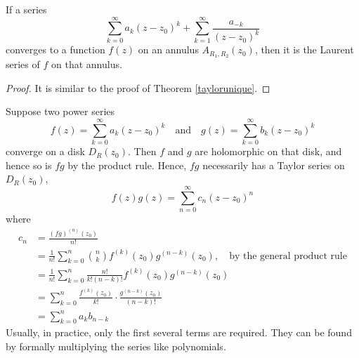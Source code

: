 \vspace*{1em}

\begin{theorem}\label{laurentunique}
If a series
\[\sum_{k=0}^\infty a_k(z - z_0)^k + \sum_{k=1}^\infty \frac{a_{-k}}{(z - z_0)^k}\]
converges to a function $f(z)$ on an annulus $A_{R_1,R_2}(z_0)$, then it is the Laurent series of $f$ on that annulus.
\end{theorem}
\begin{proof}
It is similar to the proof of Theorem \ref{taylorunique}.
\end{proof}

\vspace*{1em}

\begin{discussion}\label{powserprod}
Suppose two power series
\[f(z) = \sum_{k=0}^\infty a_k(z - z_0)^k \quad \text{and} \quad g(z) = \sum_{k=0}^\infty b_k(z - z_0)^k\]
converge on a disk $D_R(z_0)$. Then $f$ and $g$ are holomorphic on that disk, and hence so is $fg$ by the product rule. Hence, $fg$ necessarily has a Taylor series on $D_R(z_0)$,
\[f(z)g(z) = \sum_{n=0}^\infty c_n(z - z_0)^n\]
where
\begin{align*}
c_n &= \frac{(fg)^{(n)}(z_0)}{n!}\\[0.5em]
 &= \frac{1}{n!}\sum_{k=0}^n\binom{n}{k}f^{(k)}(z_0)g^{(n-k)}(z_0),\quad \text{by the general product rule}\\[0.5em]
 &= \frac{1}{n!}\sum_{k=0}^n\frac{n!}{k!(n-k)!} f^{(k)}(z_0)g^{(n-k)}(z_0)\\[0.5em]
 &= \sum_{k=0}^n\frac{f^{(k)}(z_0)}{k!}\cdot\frac{g^{(n-k)}(z_0)}{(n-k)!}\\[0.5em]
 &= \sum_{k=0}^n a_kb_{n-k}
\end{align*}
Usually, in practice, only the first several terms are required. They can be found by formally multiplying the series like polynomials.
\end{discussion}

\vspace*{1em}

